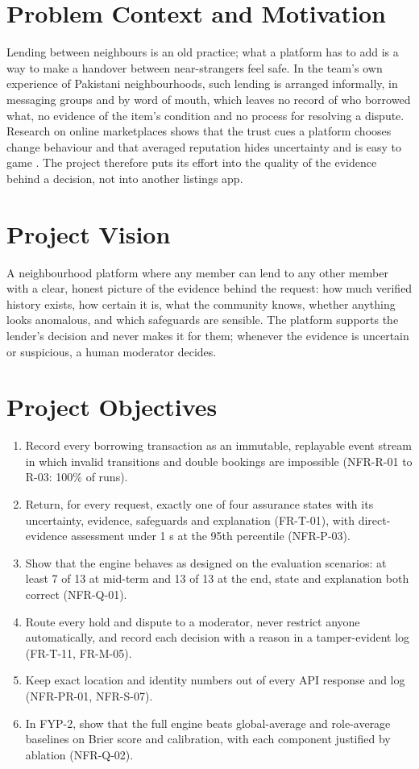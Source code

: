 \section{Problem Context and Motivation}\label{sec:problem-context-motivation}
Lending between neighbours is an old practice; what a platform has to add is a way to make a handover between near-strangers feel safe. In the team's own experience of Pakistani neighbourhoods, such lending is arranged informally, in messaging groups and by word of mouth, which leaves no record of who borrowed what, no evidence of the item's condition and no process for resolving a dispute. Research on online marketplaces shows that the trust cues a platform chooses change behaviour \cite{ert2016} and that averaged reputation hides uncertainty and is easy to game \cite{josang2007survey}. The project therefore puts its effort into the quality of the evidence behind a decision, not into another listings app.

\section{Project Vision}\label{sec:project-vision}
A neighbourhood platform where any member can lend to any other member with a clear, honest picture of the evidence behind the request: how much verified history exists, how certain it is, what the community knows, whether anything looks anomalous, and which safeguards are sensible. The platform supports the lender's decision and never makes it for them; whenever the evidence is uncertain or suspicious, a human moderator decides.

\section{Project Objectives}\label{sec:project-objectives}
\begin{enumerate}
\item Record every borrowing transaction as an immutable, replayable event stream in which invalid transitions and double bookings are impossible (NFR-R-01 to R-03: 100\% of runs).
\item Return, for every request, exactly one of four assurance states with its uncertainty, evidence, safeguards and explanation (FR-T-01), with direct-evidence assessment under 1 s at the 95th percentile (NFR-P-03).
\item Show that the engine behaves as designed on the evaluation scenarios: at least 7 of 13 at mid-term and 13 of 13 at the end, state and explanation both correct (NFR-Q-01).
\item Route every hold and dispute to a moderator, never restrict anyone automatically, and record each decision with a reason in a tamper-evident log (FR-T-11, FR-M-05).
\item Keep exact location and identity numbers out of every API response and log (NFR-PR-01, NFR-S-07).
\item In FYP-2, show that the full engine beats global-average and role-average baselines on Brier score and calibration, with each component justified by ablation (NFR-Q-02).
\end{enumerate}

